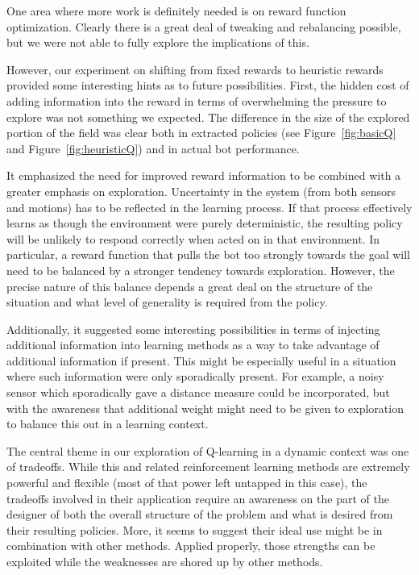 \documentclass{aiaa-tc}%
\begin{document}
One area where more work is definitely needed is on reward function
optimization. Clearly there is a great deal of tweaking and rebalancing
possible, but we were not able to fully explore the implications of
this.

However, our experiment on shifting from fixed rewards to
heuristic rewards provided some interesting hints as to future possibilities. First, the hidden cost of
adding information into the reward in terms of overwhelming the
pressure to explore was not something we expected. The difference in the size of the explored portion of the field was clear both in extracted policies (see Figure~\ref{fig:basicQ} and Figure~\ref{fig:heuristicQ}) and in actual bot performance.

It
emphasized the need for improved reward information to be combined with a greater emphasis
on exploration. Uncertainty in the system (from both sensors and
motions) has to be reflected in the learning process. If that process
effectively learns as though the environment were purely
deterministic, the resulting policy will be unlikely to respond
correctly when acted on in that environment. In particular, a reward function that pulls the bot too strongly towards the goal will need to be balanced by a stronger tendency towards exploration. However, the precise nature of this balance depends a great deal on the structure of the situation and what level of generality is required from the policy.

Additionally, it
suggested some interesting possibilities in terms of injecting
additional information into learning methods as a way to take
advantage of additional information if present. This might be
especially useful in a situation where such information were only
sporadically present. For example, a noisy sensor which sporadically
gave a distance measure could be incorporated, but with the awareness
that additional weight might need to be given to exploration to
balance this out in a learning context.

The central theme in our exploration of Q-learning in a dynamic
context was one of tradeoffs. While this and related reinforcement
learning methods are extremely powerful and flexible (most of that power
left untapped in this case), the tradeoffs involved in their application require an awareness on the part of the designer of both the overall structure of the problem and what is desired from their resulting policies. More, it 
seems to suggest their ideal use might be in combination with other
methods. Applied properly, those strengths can be exploited while the weaknesses
are shored up by other methods.
\end{document}
